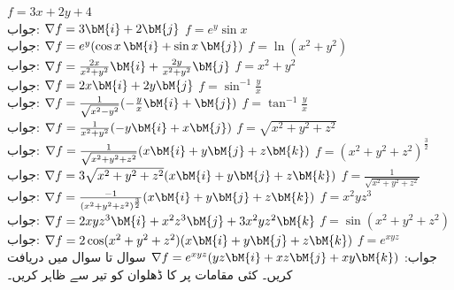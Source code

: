 \quad 
$f=3x+2y+4$\\
جواب:\quad
$\nabla f=3\bM{i}+2\bM{j}$
\quad 
$f=e^y\sin x$\\
جواب:\quad
$\nabla f=e^y(\cos x\,\bM{i}+\sin x\,\bM{j})$
\quad 
$f=\ln(x^2+y^2)$\\
جواب:\quad
$\nabla f=\frac{2x}{x^2+y^2}\bM{i}+\frac{2y}{x^2+y^2}\bM{j}$
\quad 
$f=x^2+y^2$\\
جواب:\quad
$\nabla f=2x\bM{i}+2y\bM{j}$
\quad 
$f=\sin^{-1}\frac{y}{x}$\\
جواب:\quad
$\nabla f=\frac{1}{\sqrt{x^2-y^2}}(-\frac{y}{x}\bM{i}+\bM{j})$
\quad 
$f=\tan^{-1}\frac{y}{x}$\\
جواب:\quad
$\nabla f=\frac{1}{x^2+y^2}(-y\bM{i}+x\bM{j})$
\quad 
$f=\sqrt{x^2+y^2+z^2}$\\
جواب:\quad
$\nabla f=\frac{1}{\sqrt{x^2+y^2+z^2}}(x\bM{i}+y\bM{j}+z\bM{k})$
\quad 
$f=(x^2+y^2+z^2)^{\frac{3}{2}}$\\
جواب:\quad
$\nabla f=3\sqrt{x^2+y^2+z^2}(x\bM{i}+y\bM{j}+z\bM{k})$
\quad 
$f=\frac{1}{\sqrt{x^2+y^2+z^2}}$\\
جواب:\quad
$\nabla f=\frac{-1}{(x^2+y^2+z^2)^{\frac{3}{2}}}(x\bM{i}+y\bM{j}+z\bM{k})$
\quad 
$f=x^2yz^3$\\
جواب:\quad
$\nabla f=2xyz^3\bM{i}+x^2z^3\bM{j}+3x^2yz^2\bM{k}$
\quad 
$f=\sin(x^2+y^2+z^2)$\\
جواب:\quad
$\nabla f=2\cos(x^2+y^2+z^2)(x\bM{i}+y\bM{j}+z\bM{k})$
\quad 
$f=e^{xyz}$\\
جواب:\quad
$\nabla f=e^{xyz}(yz\bM{i}+xz\bM{j}+xy\bM{k})$
سوال  تا سوال  میں  دریافت کریں۔ کئی مقامات پر    کا ڈھلوان  کو تیر سے ظاہر کریں۔ 

